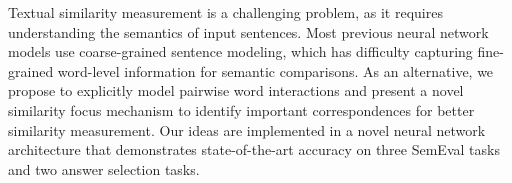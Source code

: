 Textual similarity measurement is a challenging problem, as it requires understanding the semantics of input sentences. Most previous neural network models use coarse-grained sentence modeling, which has difficulty capturing fine-grained word-level information for semantic comparisons. As an alternative, we propose to explicitly model pairwise word interactions and present a novel similarity focus mechanism to identify important correspondences for better similarity measurement. Our ideas are implemented in a novel neural network architecture that demonstrates state-of-the-art accuracy on three SemEval tasks and two answer selection tasks.
